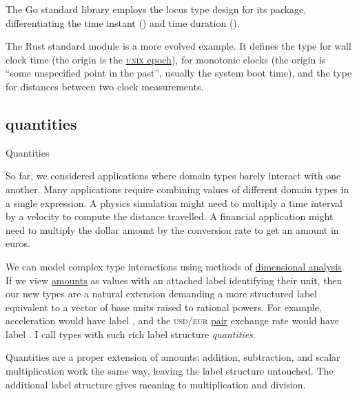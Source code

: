 \documentclass{article}
\begin{document}
The Go standard library employs the locus type design for its \href{https://pkg.go.dev/time}{} package, differentiating the time instant (\href{https://pkg.go.dev/time#Time}{}) and time duration (\href{https://pkg.go.dev/time#Duration}{}).

The Rust standard module \href{https://doc.rust-lang.org/std/time/index.html}{} is a more evolved example.
It defines the \href{https://doc.rust-lang.org/std/time/struct.SystemTime.html}{} type for wall clock time (the origin is the \href{https://doc.rust-lang.org/std/time/struct.SystemTime.html#associatedconstant.UNIX_EPOCH}{\textsc{unix} epoch}), \href{https://doc.rust-lang.org/std/time/struct.Instant.html}{} for monotonic clocks (the origin is ``some unspecified point in the past'', usually the system boot time), and the \href{https://doc.rust-lang.org/std/time/struct.Duration.html}{} type for distances between two clock measurements.

\subsection{quantities}{Quantities}

So far, we considered applications where domain types barely interact with one another.
Many applications require combining values of different domain types in a single expression.
A physics simulation might need to multiply a time interval by a velocity to compute the distance travelled.
A financial application might need to multiply the dollar amount by the conversion rate to get an amount in euros.

We can model complex type interactions using methods of \href{https://en.wikipedia.org/wiki/Dimensional_analysis}{dimensional analysis}.
If we view \href{#amounts}{amounts} as values with an attached label identifying their unit, then our new types are a natural extension demanding a more structured label equivalent to a vector of base units raised to rational powers.
For example, acceleration would have label , and the \textsc{usd}/\textsc{eur} \href{https://en.wikipedia.org/wiki/Currency_pair}{pair} exchange rate would have label .
I call types with such rich label structure \emph{quantities}.

Quantities are a proper extension of amounts: addition, subtraction, and scalar multiplication work the same way, leaving the label structure untouched.
The additional label structure gives meaning to multiplication and division.
\end{document}
